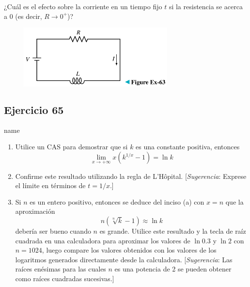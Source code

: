\documentclass[12pt]{article}
\begin{document}
¿Cuál es el efecto sobre la corriente en un tiempo fijo $t$ si la resistencia se acerca a $0$ (es decir, $R\rightarrow 0^+$)?

\begin{figure}[H]
\centering
\includegraphics[width=0.7\textwidth]{../img/img_Lista3/circuit63.png}
\end{figure}

\subsection{Ejercicio 65} name \\

\begin{enumerate}[label=\alph*)]
\item Utilice un CAS para demostrar que si $k$ es una constante positiva, entonces
  \[
  \lim_{x \to +\infty} x(k^{1/x}-1)=\ln{k}
  \]
\item Confirme este resultado utilizando la regla de L'Hôpital. [\textit{Sugerencia}: Exprese el límite en términos de $t = 1/x$.]
\item Si $n$ es un entero positivo, entonces se deduce del inciso (a) con $x = n$ que la aproximación
  \[
  n(\sqrt[n]{k}-1)\approx \ln{k}
\]
debería ser bueno cuando $n$ es grande. Utilice este resultado y la tecla de raíz cuadrada en una calculadora para aproximar los valores de $\ln{0.3}$ y $\ln{2}$ con $n = 1024$, luego compare los valores obtenidos con los valores de los logaritmos generados directamente desde la calculadora. [\textit{Sugerencia}: Las raíces enésimas para las cuales $n$ es una potencia de 2 se pueden obtener como raíces cuadradas sucesivas.]
\end{enumerate}
\end{document}
